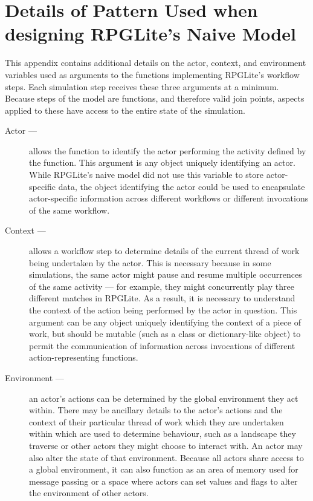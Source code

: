 \chapter{Details of Pattern Used when designing RPGLite's Naive Model}
\label{appendix_ace_pattern}

This appendix contains additional details on the actor, context, and environment
variables used as arguments to the functions implementing RPGLite's workflow
steps. Each simulation step receives these three arguments at a minimum. Because
steps of the model are functions, and therefore valid join points, aspects
applied to these have access to the entire state of the simulation.


\begin{description}
  \item[Actor ---] allows the function to identify the actor performing the activity
    defined by the function. This argument is any object uniquely identifying an
    actor. While RPGLite's naive model did not use this
    variable to store actor-specific data, the object identifying the actor
    could be used to encapsulate actor-specific information across different
    workflows or different invocations of the same workflow.
  \item[Context ---] allows a workflow step to determine details of the current
    thread of work being undertaken by the actor. This is necessary because in
    some simulations, the same actor might pause and resume multiple occurrences
    of the same activity --- for example, they might concurrently play three
    different matches in RPGLite. As a result, it is necessary to understand the
    context of the action being performed by the actor in question. This
    argument can be any object uniquely identifying the context of a piece of
    work, but should be mutable (such as a class or dictionary-like object) to
    permit the communication of information across invocations of different
    action-representing functions.
  \item[Environment ---] an actor's actions can be determined by the global
    environment they act within. There may be ancillary details to the actor's
    actions and the context of their particular thread of work which they are
    undertaken within which are used to determine behaviour, such as a landscape
    they traverse or other actors they might choose to interact with. An actor
    may also alter the state of that environment. Because all actors share
    access to a global environment, it can also function as an area of memory
    used for message passing or a space where actors can set values and flags to
    alter the environment of other actors.
    

\end{description}
